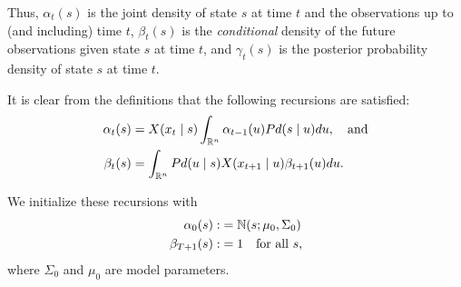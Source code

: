 \documentclass[12pt,leqno]{article}
\begin{document}
Thus, $\alpha_t(s)$ is the joint density of state $s$ at time $t$ and the observations up to (and including) time $t$,
$\beta_t(s)$ is the {\em conditional} density of the future observations given state $s$ at time $t$, and $\gamma_t(s)$
is the posterior probability density of state $s$ at time $t$.

It is clear from the definitions that the following recursions are satisfied:
\begin{align}
\alpha_t(s) &= X(x_t \mid s)\int_{{\mathbb R}^n}\alpha_{t-1}(u)Pd(s \mid u)du,\quad\text{and}\label{alpha:0}\\
\beta_t(s) &= \int_{{\mathbb R}^{n}}Pd(u \mid s)X(x_{t+1} \mid u)\beta_{t+1}(u)du.\label{beta:0}
\end{align}

We initialize these recursions with
\begin{align*}
\alpha_0(s) :&= {\mathbb N}(s;\mu_0,\Sigma_0) \\
\beta_{T+1}(s) :&= 1 \quad\text{for all $s$},
\end{align*}
where $\Sigma_0$ and $\mu_0$ are model parameters.
\end{document}
